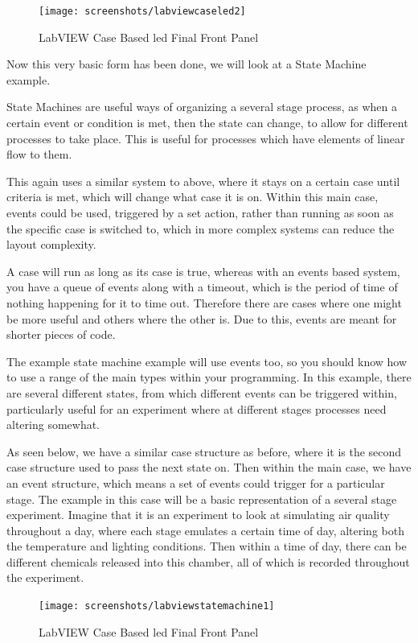 \documentclass[a4paper,11pt]{report}
\begin{document}
\begin{figure}[H]
\centering
\texttt{[image: screenshots/labviewcaseled2]}
\caption{LabVIEW Case Based \gls{led} Final Front Panel}
\end{figure}

Now this very basic form has been done, we will look at a State Machine example.

State Machines are useful ways of organizing a several stage process, as when a certain event or condition is met, then the state can change, to allow for different processes to take place. This is useful for processes which have elements of linear flow to them.

This again uses a similar system to above, where it stays on a certain case until criteria is met, which will change what case it is on. Within this main case, events could be used, triggered by a set action, rather than running as soon as the specific case is switched to, which in more complex systems can reduce the layout complexity.

A case will run as long as its case is true, whereas with an events based system, you have a queue of events along with a timeout, which is the period of time of nothing happening for it to time out. Therefore there are cases where one might be more useful and others where the other is. Due to this, events are meant for shorter pieces of code.

The example state machine example will use events too, so you should know how to use a range of the main types within your programming. In this example, there are several different states, from which different events can be triggered within, particularly useful for an experiment where at different stages processes need altering somewhat.

As seen below, we have a similar case structure as before, where it is the second case structure used to pass the next state on. Then within the main case, we have an event structure, which means a set of events could trigger for a particular stage. The example in this case will be a basic representation of a several stage experiment. Imagine that it is an experiment to look at simulating air quality throughout a day, where each stage emulates a certain time of day, altering both the temperature and lighting conditions. Then within a time of day, there can be different chemicals released into this chamber, all of which is recorded throughout the experiment.

\begin{figure}[H]
\centering
\texttt{[image: screenshots/labviewstatemachine1]}
\caption{LabVIEW Case Based \gls{led} Final Front Panel}
\end{figure}
\end{document}

